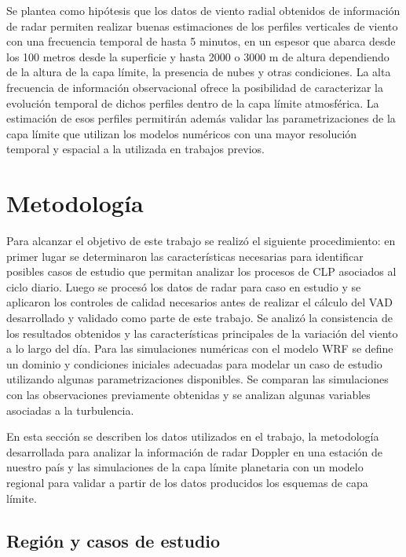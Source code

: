 \documentclass[12pt,spanish,oneside]{book}
\begin{document}
Se plantea como hipótesis que los datos de viento radial obtenidos de
información de radar permiten realizar buenas estimaciones de los
perfiles verticales de viento con una frecuencia temporal de hasta 5
minutos, en un espesor que abarca desde los 100 metros desde la
superficie y hasta 2000 o 3000 m de altura dependiendo de la altura de
la capa límite, la presencia de nubes y otras condiciones. La alta
frecuencia de información observacional ofrece la posibilidad de
caracterizar la evolución temporal de dichos perfiles dentro de la capa
límite atmosférica. La estimación de esos perfiles permitirán además
validar las parametrizaciones de la capa límite que utilizan los modelos
numéricos con una mayor resolución temporal y espacial a la utilizada en
trabajos previos.

\chapter{Metodología}\label{metodologia}

Para alcanzar el objetivo de este trabajo se realizó el siguiente
procedimiento: en primer lugar se determinaron las características
necesarias para identificar posibles casos de estudio que permitan
analizar los procesos de CLP asociados al ciclo diario. Luego se procesó
los datos de radar para caso en estudio y se aplicaron los controles de
calidad necesarios antes de realizar el cálculo del VAD desarrollado y
validado como parte de este trabajo. Se analizó la consistencia de los
resultados obtenidos y las características principales de la variación
del viento a lo largo del día. Para las simulaciones numéricas con el
modelo WRF se define un dominio y condiciones iniciales adecuadas para
modelar un caso de estudio utilizando algunas parametrizaciones
disponibles. Se comparan las simulaciones con las observaciones
previamente obtenidas y se analizan algunas variables asociadas a la
turbulencia.


En esta sección se describen los datos utilizados en el trabajo, la
metodología desarrollada para analizar la información de radar Doppler
en una estación de nuestro país y las simulaciones de la capa límite
planetaria con un modelo regional para validar a partir de los datos
producidos los esquemas de capa límite.

\section{Región y casos de estudio}\label{region-y-casos-de-estudio}
\end{document}
